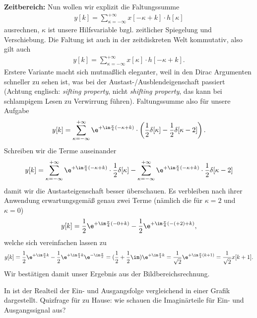 \begin{ExCalc}
\textbf{Zeitbereich:}
Nun wollen wir explizit die Faltungssumme
\begin{align}
y[k] = \sum_{\kappa=-\infty}^{+\infty} x[-\kappa + k] \cdot h[\kappa]
\end{align}
ausrechnen, $\kappa$ ist unsere Hilfsvariable bzgl. zeitlicher Spiegelung und
Verschiebung.
%
Die Faltung ist auch in der zeitdiskreten Welt kommutativ, also gilt auch
\begin{align}
y[k] = \sum_{\kappa=-\infty}^{+\infty} x[\kappa] \cdot h[-\kappa + k].
\end{align}
%
Erstere Variante macht sich mutmaßlich eleganter, weil in den Dirac Argumenten
schneller zu sehen ist, was bei der Austast-/Ausblendeigenschaft passiert
(Achtung englisch:
\textit{sifting property}, nicht \textit{shifting property}, das kann bei schlampigem
Lesen zu Verwirrung führen).
%
Faltungssumme also für unsere Aufgabe
%
\begin{align}
y[k] = \sum_{\kappa=-\infty}^{+\infty} \e^{+\im\frac{\pi}{4} (-\kappa+k)} \cdot
\left(\frac{1}{2}\delta[\kappa] - \frac{1}{2}\delta[\kappa-2]\right).
\end{align}
%
Schreiben wir die Terme auseinander
\begin{align}
y[k] =
\sum_{\kappa=-\infty}^{+\infty} \e^{+\im\frac{\pi}{4} (-\kappa+k)} \cdot \frac{1}{2}\delta[\kappa]
-
\sum_{\kappa=-\infty}^{+\infty} \e^{+\im\frac{\pi}{4} (-\kappa+k)} \cdot \frac{1}{2}\delta[\kappa-2]
\end{align}
damit wir die Austasteigenschaft besser überschauen.
%
Es verbleiben nach ihrer Anwendung erwartungsgemäß genau zwei Terme (nämlich die für
$\kappa=2$ und $\kappa=0$)
\begin{align}
y[k] =
\frac{1}{2} \e^{+\im\frac{\pi}{4} (-0+k)}
-
\frac{1}{2} \e^{+\im\frac{\pi}{4} (-(+2)+k)},
\end{align}
welche sich vereinfachen lassen zu
\begin{align}
y[k] =
\frac{1}{2} \e^{+\im\frac{\pi}{4} k}
-
\frac{1}{2} \e^{+\im\frac{\pi}{4} k} \e^{-\im\frac{\pi}{2}} =
(\frac{1}{2} + \frac{1}{2} \im )\e^{+\im\frac{\pi}{4} k}
=
\frac{1}{\sqrt{2}} \e^{+\im \frac{\pi}{4} (k+1)}=
\frac{1}{\sqrt{2}} x[k+1].
\end{align}
Wir bestätigen damit unser Ergebnis aus der Bildbereichsrechnung.

In  ist der Realteil der Ein- und Ausgangsfolge vergleichend
in einer Grafik dargestellt. Quizfrage für zu Hause: wie schauen die Imaginärteile
für Ein- und Ausgangssignal aus?
\end{ExCalc}
